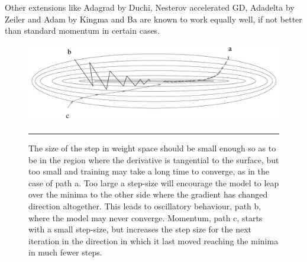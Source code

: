 Other extensions like Adagrad by Duchi\citep{duchi2011adaptive}, Nesterov accelerated GD\citep{nesterov1983method}, Adadelta by Zeiler\citep{zeiler2012adadelta} and Adam by Kingma and Ba\citep{kingma2014adam} are known to work equally well, if not better than standard momentum in certain cases.
\begin{figure}[htbp]
	\centering
		\includegraphics[width = 1.0\textwidth]{./Figures/momentum_An_introduction_to_NNs.jpg}
		\rule{35em}{0.5pt}
	\caption[Gradient Descent Comparisons]{The size of the step in weight space should be small enough so as to be in the region where the derivative is tangential to the surface, but too small and training may take a long time to converge, as in the case of path a. Too large a step-size will encourage the model to leap over the minima to the other side where the gradient has changed direction altogether. This leads to oscillatory behaviour, path b, where the model may never converge. Momentum, path c, starts with a small step-size, but increases the step size for the next iteration in the direction in which it last moved reaching the minima in much fewer steps.}
	\label{fig:Momentum_2}
\end{figure}

